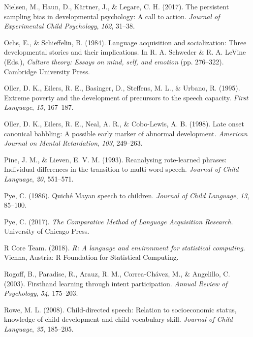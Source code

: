 \documentclass[,man,floatsintext]{apa6}
\begin{document}
\hypertarget{ref-nielsen2017persistent}{}
Nielsen, M., Haun, D., Kärtner, J., \& Legare, C. H. (2017). The
persistent sampling bias in developmental psychology: A call to action.
\emph{Journal of Experimental Child Psychology}, \emph{162}, 31--38.

\hypertarget{ref-ochs1984language}{}
Ochs, E., \& Schieffelin, B. (1984). Language acquisition and
socialization: Three developmental stories and their implications. In R.
A. Schweder \& R. A. LeVine (Eds.), \emph{Culture theory: Essays on
mind, self, and emotion} (pp. 276--322). Cambridge University Press.

\hypertarget{ref-oller1995extreme}{}
Oller, D. K., Eilers, R. E., Basinger, D., Steffens, M. L., \& Urbano,
R. (1995). Extreme poverty and the development of precursors to the
speech capacity. \emph{First Language}, \emph{15}, 167--187.

\hypertarget{ref-oller1998late}{}
Oller, D. K., Eilers, R. E., Neal, A. R., \& Cobo-Lewis, A. B. (1998).
Late onset canonical babbling: A possible early marker of abnormal
development. \emph{American Journal on Mental Retardation}, \emph{103},
249--263.

\hypertarget{ref-pine1993reanalysing}{}
Pine, J. M., \& Lieven, E. V. M. (1993). Reanalysing rote-learned
phrases: Individual differences in the transition to multi-word speech.
\emph{Journal of Child Language}, \emph{20}, 551--571.

\hypertarget{ref-pye1986quiche}{}
Pye, C. (1986). Quiché Mayan speech to children. \emph{Journal of Child
Language}, \emph{13}, 85--100.

\hypertarget{ref-pye2017comparative}{}
Pye, C. (2017). \emph{The Comparative Method of Language Acquisition
Research}. University of Chicago Press.

\hypertarget{ref-R-base}{}
R Core Team. (2018). \emph{R: A language and environment for statistical
computing}. Vienna, Austria: R Foundation for Statistical Computing.

\hypertarget{ref-rogoff2003firsthand}{}
Rogoff, B., Paradise, R., Arauz, R. M., Correa-Chávez, M., \& Angelillo,
C. (2003). Firsthand learning through intent participation. \emph{Annual
Review of Psychology}, \emph{54}, 175--203.

\hypertarget{ref-rowe2008child}{}
Rowe, M. L. (2008). Child-directed speech: Relation to socioeconomic
status, knowledge of child development and child vocabulary skill.
\emph{Journal of Child Language}, \emph{35}, 185--205.
\end{document}

